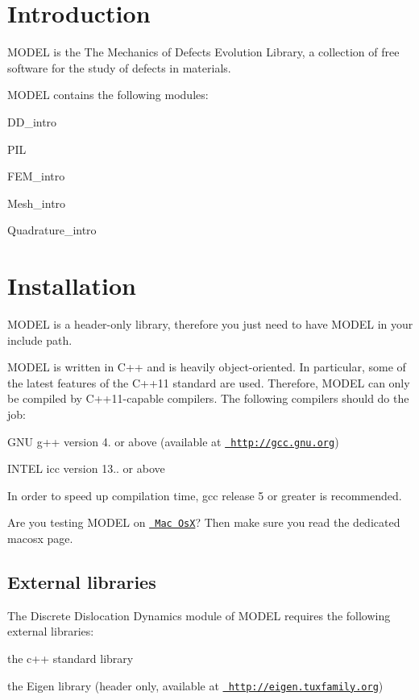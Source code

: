 \hypertarget{index_introduction}{}\section{Introduction}\label{index_introduction}
M\+O\+D\+EL is the The Mechanics of Defects Evolution Library, a collection of free software for the study of defects in materials.

M\+O\+D\+EL contains the following modules\+:
\begin{DoxyItemize}
\item D\+D\+\_\+intro
\item P\+IL
\item F\+E\+M\+\_\+intro
\item Mesh\+\_\+intro
\item Quadrature\+\_\+intro
\end{DoxyItemize}\hypertarget{index_installation}{}\section{Installation}\label{index_installation}
M\+O\+D\+EL is a header-\/only library, therefore you just need to have M\+O\+D\+EL in your include path.

M\+O\+D\+EL is written in C++ and is heavily object-\/oriented. In particular, some of the latest features of the C++11 standard are used. Therefore, M\+O\+D\+EL can only be compiled by C++11-\/capable compilers. The following compilers should do the job\+:
\begin{DoxyItemize}
\item G\+NU g++ version 4. or above (available at \href{http://gcc.gnu.org}{\texttt{ http\+://gcc.\+gnu.\+org}})
\item I\+N\+T\+EL icc version 13.. or above
\end{DoxyItemize}

In order to speed up compilation time, gcc release 5 or greater is recommended.

Are you testing M\+O\+D\+EL on \href{http://www.apple.com/osx/}{\texttt{ Mac OsX}}? Then make sure you read the dedicated macosx page.\hypertarget{index_libraries}{}\subsection{External libraries}\label{index_libraries}
The Discrete Dislocation Dynamics module of M\+O\+D\+EL requires the following external libraries\+:
\begin{DoxyItemize}
\item the c++ standard library
\item the Eigen library (header only, available at \href{http://eigen.tuxfamily.org}{\texttt{ http\+://eigen.\+tuxfamily.\+org}})
\end{DoxyItemize}

